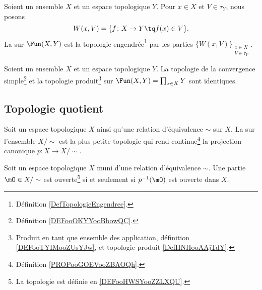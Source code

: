 \begin{definition}	\label{DEFooOKYYooBbowQC}
	Soient un ensemble \( X\) et un espace topologique \( Y\). Pour \( x\in X\) et \( V\in\tau_Y\), nous posons
	\begin{equation}
		W(x,V)=\{f \colon X\to Y\tq f(x)\in V   \}.
	\end{equation}
	La  sur \( \Fun(X,Y)\) est la topologie engendrée\footnote{Définition \ref{DefTopologieEngendree}.} par les parties \( \{ W(x,V) \}_{\substack{ x\in X \\ V\in\tau_Y }  }\).
\end{definition}

\begin{proposition}	\label{PROPooWLWYooBWCajp}
	Soient un ensemble \( X\) et un espace topologique \( Y\). La topologie de la convergence simple\footnote{Définition \ref{DEFooOKYYooBbowQC}.} et la topologie produit\footnote{Produit en tant que ensemble des application, définition \ref{DEFooTYIMooZUsYJw}, et topologie produit \ref{DefIINHooAAjTdY}.} sur \( \Fun(X,Y)=\prod_{x\in X}Y\) sont identiques.
\end{proposition}

\subsection{Topologie quotient}

\begin{definition}        \label{DEFooHWSYooZZLXQU}
	Soit un espace topologique \( X\) ainsi qu'une relation d'équivalence \( \sim\) sur \( X\). La  sur l'ensemble \( X/\sim\) est la plus petite topologie qui rend continue\footnote{Définition \ref{PROPooGOEVooZBAOQh}.} la projection canonique \( p\colon X\to X/\sim\).
\end{definition}

\begin{proposition}     \label{PROPooDRPLooONCwYs}
	Soit un espace topologique \( X\) muni d'une relation d'équivalence \( \sim\). Une partie \( \mO\in X/\sim\) est ouverte\footnote{La topologie est définie en \ref{DEFooHWSYooZZLXQU}.} si et seulement si \( p^{-1}(\mO)\) est ouverte dans \( X\).
\end{proposition}


